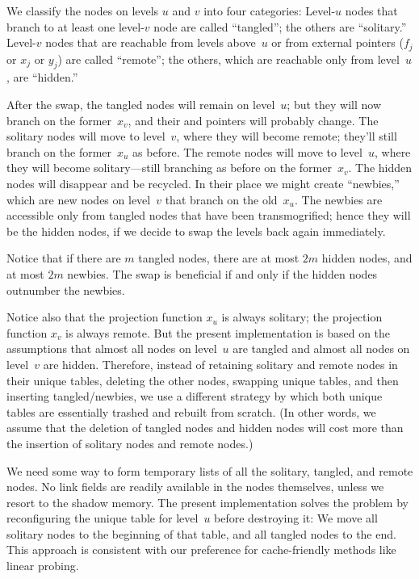 We classify the nodes on levels $u$ and $v$ into four categories:
Level-$u$ nodes that branch to at least one level-$v$ node are called
``tangled''; the others are ``solitary.'' Level-$v$ nodes that are
reachable from levels above~$u$ or from external pointers ($f_j$ or
$x_j$ or $y_j$) are called ``remote''; the others, which are reachable
only from level~$u$, are ``hidden.''

After the swap, the tangled nodes will remain on level~$u$; but they
will now branch on the former~$x_v$, and their  and 
pointers
will probably change. The solitary nodes will move to
level~$v$, where they will become remote; they'll still branch
on the former~$x_u$ as before.
The remote nodes will move to level~$u$, where they will become
solitary---still branching as before on the former~$x_v$.
The hidden nodes will
disappear and be recycled. In their place we might create ``newbies,''
which are new nodes on level~$v$ that branch on the old~$x_u$.
The newbies are accessible only from tangled nodes that have been
transmogrified; hence they will be
the hidden nodes, if we decide to swap the levels back again immediately.

Notice that if there are $m$ tangled nodes, there are at most $2m$
hidden nodes, and at most $2m$ newbies. The swap is beneficial if and
only if the hidden nodes outnumber the newbies.

Notice also that
the projection function $x_u$ is always solitary; the projection
function $x_v$ is always remote. But the present implementation
is based on the assumptions that almost all nodes on level~$u$
are tangled and almost all nodes on level~$v$ are hidden.
Therefore, instead of retaining solitary and remote nodes in their unique
tables, deleting the other nodes, swapping unique tables, and then inserting
tangled/newbies, we use a different strategy by which both unique tables
are essentially trashed and rebuilt from scratch. (In other words,
we assume that the deletion of
tangled nodes and hidden nodes will cost more than the insertion of
solitary nodes and remote nodes.)

We need some way to form temporary lists of all the solitary, tangled, and
remote nodes. No link fields are readily available in the nodes themselves,
unless we resort to the shadow memory.
The present implementation solves the problem by reconfiguring
the unique table for level~$u$ before destroying it: We move
all solitary nodes to the beginning of that table, and all tangled
nodes to the end. This approach is consistent with our preference for
cache-friendly methods like linear probing.

